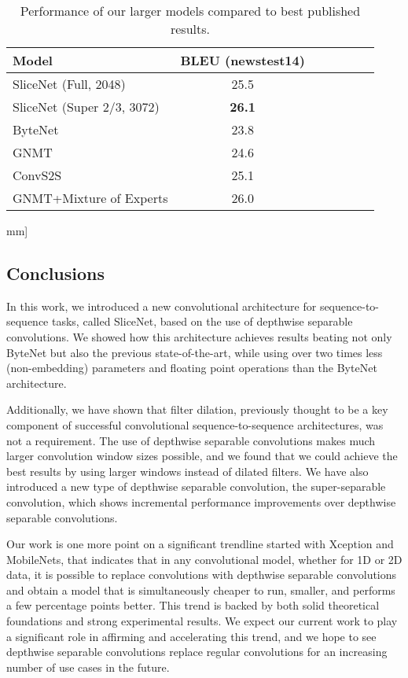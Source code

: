 \documentclass{article}
\begin{document}
\begin{table}
  \centering
  \begin{tabular}{lclcccc}
    \toprule
    Model & BLEU (newstest14) \\
    \midrule
    SliceNet (Full, 2048)      & 25.5 \\
    SliceNet (Super 2/3, 3072) & {\bf 26.1} \\
    \midrule
    ByteNet  \cite{bytenet2016}         & 23.8 \\
    GNMT  \cite{GNMT}                   & 24.6 \\
    ConvS2S  \cite{fbpaper}             & 25.1 \\
    GNMT+Mixture of Experts  \cite{moe}  & 26.0 \\
  \bottomrule
  \end{tabular}\4mm]
  \caption{Performance of our larger models compared to
    best published results.}
  \label{table:large_models}
\end{table}


\subsection{Conclusions}

In this work, we introduced a new convolutional architecture for sequence-to-sequence tasks, called SliceNet, based on the use of depthwise separable convolutions. We showed how this architecture achieves results beating not only ByteNet but also the previous
state-of-the-art, while using over two times less (non-embedding) parameters and floating point operations than the ByteNet architecture.

Additionally, we have shown that filter dilation, previously thought to be a key component of successful convolutional sequence-to-sequence architectures, was not a requirement. The use of depthwise separable convolutions makes much larger convolution window sizes possible, and we found that we could achieve the best results by using larger windows instead of dilated filters. We have also introduced a new type of depthwise separable convolution, the super-separable convolution, which shows incremental performance improvements over depthwise separable convolutions.

Our work is one more point on a significant trendline started with Xception and MobileNets, that indicates that in any convolutional model, whether for 1D or 2D data, it is possible to replace convolutions with depthwise separable convolutions and obtain a model that is simultaneously cheaper to run, smaller, and performs a few percentage points better. This trend is backed by both solid theoretical foundations and strong experimental results. We expect our current work to play a significant role in affirming and accelerating this trend, and we hope to see depthwise separable convolutions replace regular convolutions for an increasing number of use cases in the future.
\end{document}
